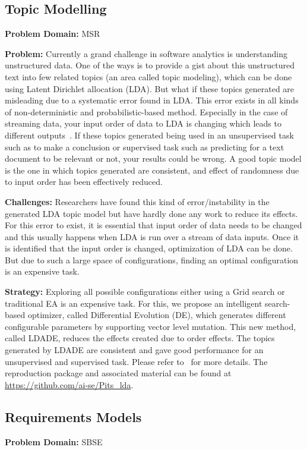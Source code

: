\documentclass[table, xcdraw, sigconf,review, anonymous]{acmart}
\begin{document}
\subsection{Topic Modelling}
\noindent\textbf{Problem Domain: } MSR

\noindent\textbf{Problem:} Currently a grand challenge in software analytics is understanding unstructured data. One of the ways is to provide a gist about this unstructured text into few related topics (an area called topic modeling), which can be done using Latent Dirichlet allocation (LDA). But what if these topics generated are misleading due to a systematic error found in LDA. This error exists in all kinds of non-deterministic and probabilistic-based method. Especially in the case of streaming data, your input order of data to LDA is changing which leads to different outputs~\cite{gennari1989models}. If these topics generated being used in an unsupervised task such as to make a conclusion or supervised task such as predicting for a text document to be relevant or not, your results could be wrong. A good topic model is the one in which topics generated are consistent, and effect of randomness due to input order has been effectively reduced.

\noindent\textbf{Challenges: } Researchers have found this kind of error/instability in the generated LDA topic model but have hardly done any work to reduce its effects. For this error to exist, it is essential that input order of data needs to be changed and this usually happens when LDA is run over a stream of data inputs. Once it is identified that the input order is changed, optimization of LDA can be done. But due to such a large space of configurations, finding an optimal configuration is an expensive task. 

\noindent\textbf{Strategy:} Exploring all possible configurations either using a Grid search or traditional EA is an expensive task. For this, we propose an intelligent search-based optimizer, called Differential Evolution (DE), which generates different configurable parameters by supporting vector level mutation. This new method, called LDADE, reduces the effects created due to order effects. The topics generated by LDADE are consistent and gave good performance for an unsupervised and supervised task. Please refer to~\cite{agrawalwrong} for more details. The reproduction package and associated material can be found at \url{https://github.com/ai-se/Pits_lda}.

 \subsection{Requirements Models}
    \textbf{Problem Domain: } SBSE
    
\end{document}
